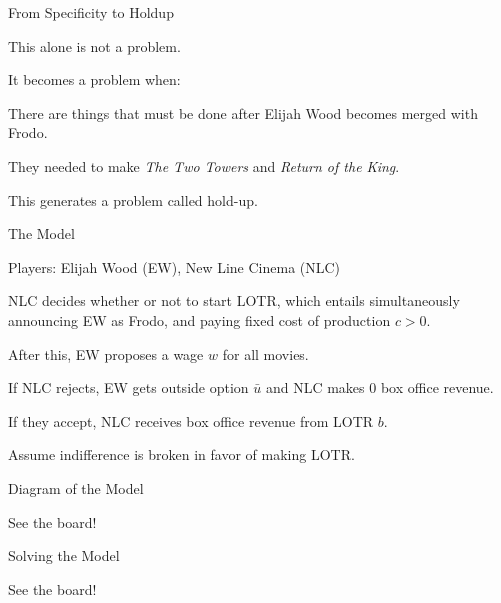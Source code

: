\documentclass[aspectratio=169,usenames,dvipsnames]{beamer}
\newenvironment{wideitemize}{\itemize\addtolength{\itemsep}{10pt}}{\enditemize}
\begin{document}
\begin{frame}{From Specificity to Holdup}
\begin{wideitemize}
    \item This alone is not a problem.
    \item It becomes a problem when:
    \begin{wideitemize}
        \item There are things that must be done after Elijah Wood becomes merged with Frodo.
          \begin{wideitemize}
            \item They needed to make \textit{The Two Towers} and \textit{Return of the King}.
        \end{wideitemize}
        \item This generates a problem called hold-up.
    \end{wideitemize}

\end{wideitemize}
    
\end{frame}


\begin{frame}{The Model}

\begin{wideitemize}
    \item Players: Elijah Wood (EW), New Line Cinema (NLC) 
    \item NLC decides whether or not to start LOTR, which entails simultaneously announcing EW as Frodo, and paying fixed cost of production $c>0$.
    \item After this, EW proposes a wage $w$ for all movies.
    \item If NLC rejects, EW gets outside option $\bar u$ and NLC makes 0 box office revenue.
    \item If they accept, NLC receives box office revenue from LOTR $b$.
    \item Assume indifference is broken in favor of making LOTR.
\end{wideitemize}
    
\end{frame}


\begin{frame}{Diagram of the Model}

    \huge See the board!

    
\end{frame}

\begin{frame}{Solving the Model}

    \huge See the board!

    
\end{frame}
\end{document}
